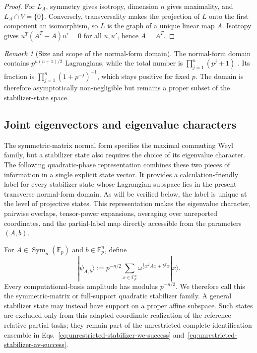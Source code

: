 \documentclass[11pt]{article}
\newcommand{\F}{\mathbb F}
\newcommand{\Sym}{\operatorname{Sym}}
\newcommand{\1}{\mathbf 1}
\theoremstyle{plain}
\theoremstyle{definition}
\theoremstyle{remark}
\newtheorem{remark}[theorem]{Remark}
\begin{document}
\begin{proof}
For $L_A$, symmetry gives isotropy, dimension $n$ gives maximality, and
$L_A\cap V=\{0\}$. Conversely, transversality makes the projection of $L$ onto
the first component an isomorphism, so $L$ is the graph of a unique linear map
$A$. Isotropy gives $u^T(A^T-A)u'=0$ for all $u,u'$, hence $A=A^T$.
\end{proof}

\begin{remark}[Size and scope of the normal-form domain]
\label{rem:symmetric-matrix-normal-form-nonvanishing-fraction}
The normal-form domain contains $p^{n(n+1)/2}$ Lagrangians, while the total number is
$\prod_{j=1}^n(p^j+1)$ \cite{Gross2006,SingalEtAl2023Counting}. Its fraction is
$\prod_{j=1}^n(1+p^{-j})^{-1}$, which stays positive for fixed $p$. The domain
is therefore asymptotically non-negligible but remains a proper subset of the
stabilizer-state space.
\end{remark}

\subsection{Joint eigenvectors and eigenvalue characters}
\label{subsec:odd-joint-eigenvectors}
The symmetric-matrix normal form specifies the maximal commuting Weyl family,
but a stabilizer state also requires the choice of its eigenvalue character.
The following quadratic-phase representation combines these two pieces of
information in a single explicit state vector.  It provides a
calculation-friendly label for every stabilizer state whose Lagrangian
subspace lies in the present transverse normal-form domain.  As will be
verified below, the label is unique at the level of projective states.  This
representation makes the eigenvalue character, pairwise overlaps, tensor-power
expansions, averaging over unreported coordinates, and the partial-label map
directly accessible from the parameters $(A,b)$.

For $A\in\Sym_n(\F_p)$ and $b\in\F_p^n$, define
\begin{equation}
  |\psi_{A,b}\rangle
  :=p^{-n/2}\sum_{x\in\F_p^n}
  \omega^{\frac12x^TAx+b^Tx}|x\rangle.
  \label{eq:odd-quadratic-state}
\end{equation}
Every computational-basis amplitude has modulus $p^{-n/2}$. We therefore call
this the symmetric-matrix or full-support quadratic stabilizer family.  A general
stabilizer state may instead have support on a proper affine subspace.  Such
states are excluded only from this adapted coordinate realization of the
reference-relative partial tasks; they remain part of the unrestricted complete-identification
ensemble in Eqs.~\eqref{eq:unrestricted-stabilizer-wc-success} and~\eqref{eq:unrestricted-stabilizer-av-success}.
\end{document}
